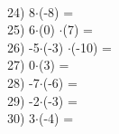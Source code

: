 \documentclass[a4paper,10pt]{article}
\begin{document}
\vspace{0.5cm}\\24)   8$\cdot$(-8) =
\vspace{0.5cm}\\25)   6$\cdot$(0) $\cdot$(7) =
\vspace{0.5cm}\\26)   -5$\cdot$(-3) $\cdot$(-10) =
\vspace{0.5cm}\\27)   0$\cdot$(3) =
\vspace{0.5cm}\\28)   -7$\cdot$(-6) =
\vspace{0.5cm}\\29)   -2$\cdot$(-3) =
\vspace{0.5cm}\\30)   3$\cdot$(-4) =
\vspace{0.5cm}\\\pagebreak
\end{document}
